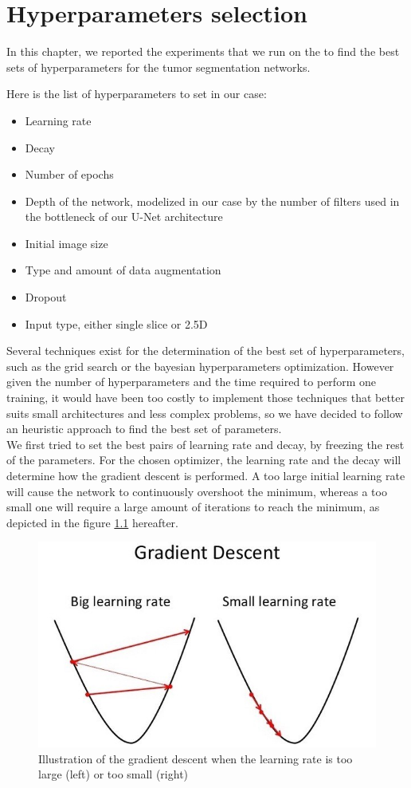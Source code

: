 \renewcommand{\arraystretch}{1}
\setlength{\tabcolsep}{7pt}

\chapter{Hyperparameters
selection}\label{appendix---hyperparameters-selection}

In this chapter, we reported the experiments that we run on the
 to find the best sets of hyperparameters for the tumor
segmentation networks.

Here is the list of hyperparameters to set in our case:

\begin{itemize}
\item
  Learning rate
\item
  Decay
\item
  Number of epochs
\item
  Depth of the network, modelized in our case by the number of filters
  used in the bottleneck of our U-Net architecture
\item
  Initial image size
\item
  Type and amount of data augmentation
\item
  Dropout
\item
  Input type, either single slice or 2.5D
\end{itemize}

Several techniques exist for the determination of the best set of
hyperparameters, such as the grid search or the bayesian hyperparameters
optimization. However given the number of hyperparameters and the time
required to perform one training, it would have been too costly to
implement those techniques that better suits small architectures and
less complex problems, so we have decided to follow an heuristic
approach to find the best set of parameters.\\
We first tried to set the best pairs of learning rate and decay, by
freezing the rest of the parameters. For the chosen optimizer, the
learning rate and the decay will determine how the gradient descent is
performed. A too large initial learning rate will cause the network to
continuously overshoot the minimum, whereas a too small one will require
a large amount of iterations to reach the minimum, as depicted in the figure \ref{fig:gradientDescent}
hereafter.

\begin{figure}
\centering
\includegraphics[width=0.5\linewidth]{Appendix/images/media/image1}
\caption{Illustration of the gradient descent when the learning rate is too large (left) or too small (right)}
\label{fig:gradientDescent}
\end{figure}


